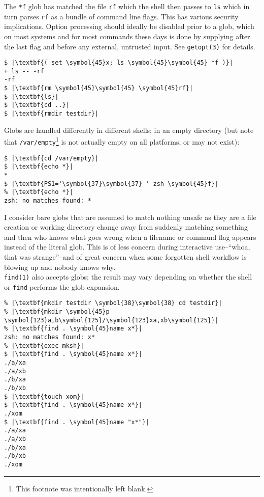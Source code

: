 \documentclass[10pt,a4paper]{article}
\begin{document}
The \texttt{*f} glob has matched the file \texttt{rf} which
the shell then passes to \texttt{ls} which in turn parses
\texttt{rf} as a bundle of command line flags. This has
various security implications. Option processing should ideally be
disabled prior to a glob, which on most systems and for most commands
these days is done by supplying \texttt{} after
the last flag and before any external, untrusted input. See
\texttt{getopt(3)} for details.

\begin{lstlisting}
$ |\textbf{( set \symbol{45}x; ls \symbol{45}\symbol{45} *f )}|
+ ls -- -rf
-rf
$ |\textbf{rm \symbol{45}\symbol{45} \symbol{45}rf}|
$ |\textbf{ls}|
$ |\textbf{cd ..}|
$ |\textbf{rmdir testdir}|
\end{lstlisting}

Globs are handled differently in different shells; in an empty directory
(but note that \texttt{/var/empty}\footnote{This footnote was
intentionally left blank.} is not actually empty on all platforms, or
may not exist):

\begin{lstlisting}
$ |\textbf{cd /var/empty}|
$ |\textbf{echo *}|
*
$ |\textbf{PS1='\symbol{37}\symbol{37} ' zsh \symbol{45}f}|
% |\textbf{echo *}|
zsh: no matches found: *
\end{lstlisting}
 
I consider bare globs that are assumed to match nothing unsafe as they
are a file creation or working directory change away from suddenly
matching something and then who knows what goes wrong when a filename or
command flag appears instead of the literal glob. This is of less
concern during interactive use--``whoa, that was strange''--and of great
concern when some forgotten shell workflow is blowing up and nobody
knows why. \\

\texttt{find(1)} also accepts globs; the result may vary depending on
whether the shell or \texttt{find} performs the glob expansion.

\begin{lstlisting}
% |\textbf{mkdir testdir \symbol{38}\symbol{38} cd testdir}|
% |\textbf{mkdir \symbol{45}p \symbol{123}a,b\symbol{125}/\symbol{123}xa,xb\symbol{125}}|
% |\textbf{find . \symbol{45}name x*}|
zsh: no matches found: x*
% |\textbf{exec mksh}|
$ |\textbf{find . \symbol{45}name x*}|
./a/xa
./a/xb
./b/xa
./b/xb
$ |\textbf{touch xom}|
$ |\textbf{find . \symbol{45}name x*}|
./xom
$ |\textbf{find . \symbol{45}name "x*"}|
./a/xa
./a/xb
./b/xa
./b/xb
./xom
\end{lstlisting}
\end{document}
